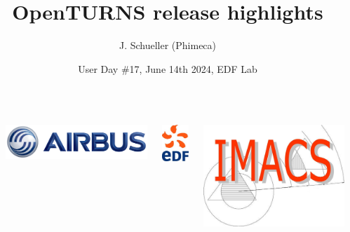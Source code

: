 \documentclass[aspectratio=169]{beamer}
\title[OpenTURNS]{OpenTURNS release highlights}
\author[OpenTURNS et al.]{J. Schueller (Phimeca)}
\date[]{User Day \#17, June 14th 2024, EDF Lab}
\begin{document}

  \begin{frame}
  \titlepage

  \begin{columns}
  \begin{column}[t]{0.05\textwidth}
        \end{column}
  
  \begin{center}
\includegraphics[height=0.04\textheight]{figures/airbus-logo-3d-blue.png}
\end{center}

  \begin{center}
\includegraphics[height=0.09\textheight]{figures/logo-edf.jpg}
\end{center}

  \begin{center}
\includegraphics[height=0.09\textheight]{figures/imacs-logo.jpg}
\end{center}


\end{columns}
\end{frame}
\end{document}
